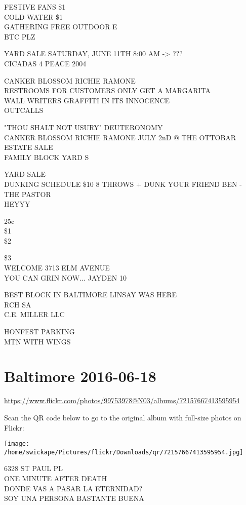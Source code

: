 \documentclass[10pt,letterpaper]{article}
\begin{document}
FESTIVE FANS \$1\\
COLD WATER \$1\\
GATHERING FREE OUTDOOR E\\
BTC PLZ

YARD SALE SATURDAY, JUNE 11TH 8:00 AM {-}> ???\\
CICADAS 4 PEACE 2004

CANKER BLOSSOM RICHIE RAMONE\\
RESTROOMS FOR CUSTOMERS ONLY GET A MARGARITA\\
WALL WRITERS GRAFFITI IN ITS INNOCENCE\\
OUTCALLS

"THOU SHALT NOT USURY" DEUTERONOMY\\
CANKER BLOSSOM RICHIE RAMONE JULY 2nD @ THE OTTOBAR\\
ESTATE SALE\\
FAMILY BLOCK YARD S

YARD SALE\\
DUNKING SCHEDULE \$10 8 THROWS + DUNK YOUR FRIEND BEN {-} THE PASTOR\\
HEYYY

25¢\\
\$1\\
\$2

\$3\\
WELCOME 3713 ELM AVENUE\\
YOU CAN GRIN NOW... JAYDEN 10

BEST BLOCK IN BALTIMORE LINSAY WAS HERE\\
RCH SA\\
C.E. MILLER LLC

HONFEST PARKING\\
MTN WITH WINGS


\section*{Baltimore 2016-06-18}

\url{https://www.flickr.com/photos/99753978@N03/albums/72157667413595954}

Scan the QR code below to go to the original album with full-size photos on Flickr:

\texttt{[image: /home/swickape/Pictures/flickr/Downloads/qr/72157667413595954.jpg]}


6328 ST PAUL PL\\
ONE MINUTE AFTER DEATH\\
DONDE VAS A PASAR LA ETERNIDAD?\\
SOY UNA PERSONA BASTANTE BUENA
\end{document}
